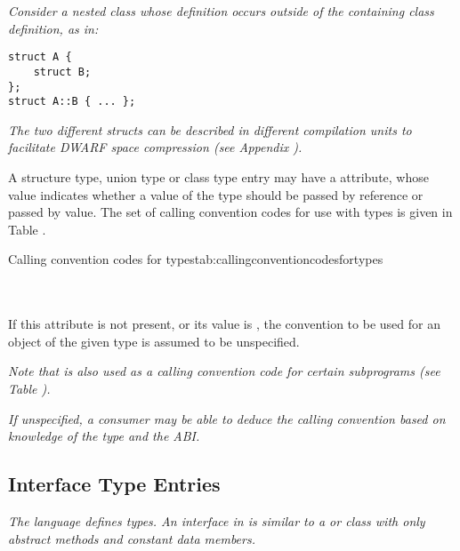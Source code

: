 \textit{Consider a nested class whose 
definition occurs outside of the containing class definition, as in:}

\begin{lstlisting}[numbers=none]
struct A {
    struct B;
};
struct A::B { ... };
\end{lstlisting}

\textit{The two different structs can be described in 
different compilation units to 
facilitate DWARF space compression 
(see Appendix ).}

A structure type, union type or class type entry may have a
\DWATcallingconventionDEFN{} attribute,
whose value indicates whether a value of the type should be passed by reference 
or passed by value. The set of calling convention codes for use with types 
\hypertarget{chap:DWATcallingconventionfortypes}{}
is given in Table .

\begin{simplenametable}[2.2in]{Calling convention codes for types}{tab:callingconventioncodesfortypes}
\DWCCnormal             \\
\DWCCpassbyvalueTARG        \\
\DWCCpassbyreferenceTARG    \\
\end{simplenametable}

If this attribute is not present, or its value is
\DWCCnormalNAME, the convention to be used for an object of the
given type is assumed to be unspecified.

\textit{Note that \DWCCnormalNAME{} is also used as a calling convention 
code for certain subprograms 
(see Table ).}

\textit{If unspecified, a consumer may be able to deduce the calling
convention based on knowledge of the type and the ABI.}


\subsection{Interface Type Entries}
\label{chap:interfacetypeentries}

\textit{The  language defines  types. 
An interface
in  is similar to a  or 
 class with only abstract
methods and constant data members.}

